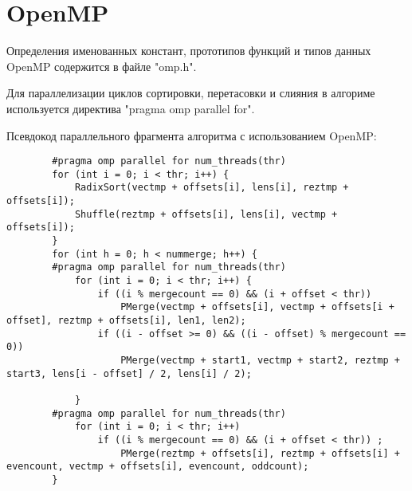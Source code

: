 \documentclass{report}
\begin{document}
	\section*{OpenMP}
	Определения именованных констант, прототипов функций и типов данных OpenMP содержится в файле "omp.h".
	\par Для параллелизации циклов сортировки, перетасовки и слияния в алгориме используется директива "pragma omp parallel for".
	\par Псевдокод параллельного фрагмента алгоритма с использованием OpenMP:
	\begin{lstlisting}
		#pragma omp parallel for num_threads(thr)
		for (int i = 0; i < thr; i++) {
			RadixSort(vectmp + offsets[i], lens[i], reztmp + offsets[i]);
			Shuffle(reztmp + offsets[i], lens[i], vectmp + offsets[i]);
		}
	    for (int h = 0; h < nummerge; h++) {
		#pragma omp parallel for num_threads(thr)
			for (int i = 0; i < thr; i++) {
				if ((i % mergecount == 0) && (i + offset < thr))
					PMerge(vectmp + offsets[i], vectmp + offsets[i + offset], reztmp + offsets[i], len1, len2);
				if ((i - offset >= 0) && ((i - offset) % mergecount == 0)) 
					PMerge(vectmp + start1, vectmp + start2, reztmp + start3, lens[i - offset] / 2, lens[i] / 2);

			}
		#pragma omp parallel for num_threads(thr)
			for (int i = 0; i < thr; i++)
				if ((i % mergecount == 0) && (i + offset < thr)) ;
					PMerge(reztmp + offsets[i], reztmp + offsets[i] + evencount, vectmp + offsets[i], evencount, oddcount);
		}
	\end{lstlisting}
	\newpage
	
\end{document}
